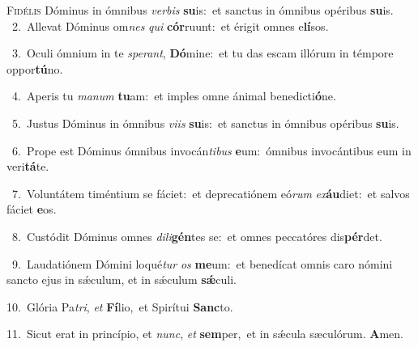 \lettrine{\initial\textcolor{\initialcolor}{F}}{idélis} Dóminus in ómnibus \textit{ver}\-\textit{bis} \textbf{su}\-is:~\star et sanctus in ómnibus opéribus \textbf{su}\-is.\\
{\numbfont\textcolor{\numbcolor}{~2.}}~Allevat Dóminus om\textit{nes} \textit{qui} \textbf{cór}\-ruunt:~\star et érigit omnes e\-\textbf{lí}\-sos.\par
{\numbfont\textcolor{\numbcolor}{~3.}}~Oculi ómnium in te \textit{spe}\-\textit{rant}, \textbf{Dó}\-mine:~\star et tu das escam illórum in témpore oppor\-\textbf{tú}\-no.\par
{\numbfont\textcolor{\numbcolor}{~4.}}~Aperis tu \textit{ma}\-\textit{num} \textbf{tu}\-am:~\star et imples omne ánimal benedicti\-\textbf{ó}\-ne.\par
{\numbfont\textcolor{\numbcolor}{~5.}}~Justus Dóminus in ómnibus \textit{vi}\-\textit{is} \textbf{su}\-is:~\star et sanctus in ómnibus opéribus \textbf{su}\-is.\par
{\numbfont\textcolor{\numbcolor}{~6.}}~Prope est Dóminus ómnibus invocán\-\textit{ti}\-\textit{bus} \textbf{e}\-um:~\star ómnibus invocántibus eum in veri\-\textbf{tá}\-te.\par
{\numbfont\textcolor{\numbcolor}{~7.}}~Voluntátem timéntium se fáciet:~\dagger et deprecatiónem eó\textit{rum} \textit{ex}\-\textbf{áu}diet:~\star et salvos fáciet \textbf{e}\-os.\par
{\numbfont\textcolor{\numbcolor}{~8.}}~Custódit Dóminus omnes \textit{di}\-\textit{li}\textbf{gén}tes se:~\star et omnes peccatóres dis\-\textbf{pér}\-det.\par
{\numbfont\textcolor{\numbcolor}{~9.}}~Laudatiónem Dómini loqué\textit{tur} \textit{os} \textbf{me}\-um:~\star et benedícat omnis caro nómini sancto ejus in sǽculum, et in sǽculum \textbf{sǽ}\-culi.\par
{\numbfont\textcolor{\numbcolor}{10.}}~Glória Pa\-\textit{tri}\-, \textit{et} \textbf{Fí}\-lio,~\star et Spirítui \textbf{Sanc}\-to.\par
{\numbfont\textcolor{\numbcolor}{11.}}~Sicut erat in princípio, et \textit{nunc}\-, \textit{et} \textbf{sem}\-per,~\star et in sǽcula sæculórum. \textbf{A}\-men.\par
